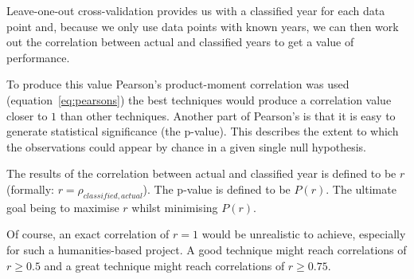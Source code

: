 Leave-one-out cross-validation provides us with a classified year for each data point and, because
we only use data points with known years, we can then work out the correlation between actual and
classified years to get a value of performance.

To produce this value Pearson's product-moment correlation was used (equation~\ref{eq:pearsons})
the best techniques would produce a correlation value closer to $1$ than other techniques. Another
part of Pearson's is that it is easy to generate statistical significance (the p-value). This
describes the extent to which the observations could appear by chance in a given single null
hypothesis.

The results of the correlation between actual and classified year is defined to be $r$ 
(formally: $r=\rho_{classified, actual}$). The p-value is defined to be $P(r)$. The ultimate goal 
being to maximise $r$ whilst minimising $P(r)$.

Of course, an exact correlation of $r=1$ would be unrealistic to achieve, especially for such a 
humanities-based project. A good technique might reach correlations of $r \ge 0.5$ and a great
technique might reach correlations of $r \ge 0.75$.



